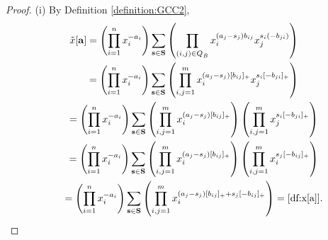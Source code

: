 \documentclass[pdftex]{sigma}
\numberwithin{equation}{section}
\begin{document}
\begin{proof}
(i) By Def\/inition \ref{definition:GCC2},
\begin{gather*}
\tilde{x}[\mathbf{a}] =\left(\prod_{i=1}^n  x_i^{-a_i}\right)
\sum_{\mathbf{s}\in \mathbf{S}}\left(\prod_{(i,j)\in Q_{\tilde B}}  x_{i}^{(a_j-s_j)b_{ij}} x_{j}^{s_i(-b_{ji})}\right)\\
 \hphantom{\tilde{x}[\mathbf{a}]}{} =\left(\prod_{i=1}^n  x_i^{-a_i}\right)
\sum_{\mathbf{s}\in \mathbf{S}}\left(\prod_{i,j=1}^m  x_{i}^{(a_j-s_j)[b_{ij}]_+} x_{j}^{s_i[-b_{ji}]_+}\right)\\
\hphantom{\tilde{x}[\mathbf{a}]}{}
=\left(\prod_{i=1}^n  x_i^{-a_i}\right)
\sum_{\mathbf{s}\in \mathbf{S}}\left(\prod_{i,j=1}^m  x_{i}^{(a_j-s_j)[b_{ij}]_+}\right)
\left(\prod_{i,j=1}^m  x_j^{s_i[-b_{ji}]_+}\right)
\\
\hphantom{\tilde{x}[\mathbf{a}]}{}
=\left(\prod_{i=1}^n  x_i^{-a_i}\right)
\sum_{\mathbf{s}\in \mathbf{S}}\left(\prod_{i,j=1}^m  x_{i}^{(a_j-s_j)[b_{ij}]_+}\right)
\left(\prod_{i,j=1}^m  x_i^{s_j[-b_{ij}]_+}\right)
\\
\hphantom{\tilde{x}[\mathbf{a}]}{}
=\left(\prod_{i=1}^n  x_i^{-a_i}\right)
\sum_{\mathbf{s}\in \mathbf{S}}\left(\prod_{i,j=1}^m  x_{i}^{(a_j-s_j)[b_{ij}]_++s_j[-b_{ij}]_+}\right)=\eqref{df:x[a]}.
\end{gather*}


\end{proof}
\end{document}
